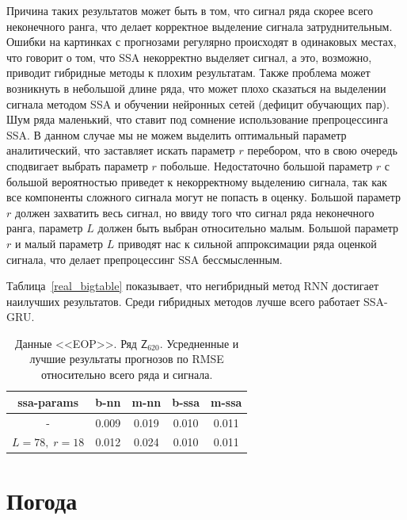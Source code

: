 \documentclass[specialist,
               substylefile = spbu.rtx,
               subf,href,colorlinks=true, 12p]{disser}
\begin{document}
Причина таких результатов может быть в том, что сигнал ряда скорее всего неконечного ранга, что делает корректное выделение сигнала затруднительным. Ошибки на картинках с прогнозами регулярно происходят в одинаковых местах, что говорит о том, что SSA некорректно выделяет сигнал, а это, возможно, приводит гибридные методы к плохим результатам. Также проблема может возникнуть в небольшой длине ряда, что может плохо сказаться на выделении сигнала методом SSA и обучении нейронных сетей (дефицит обучающих пар). Шум ряда маленький, что ставит под сомнение использование препроцессинга SSA. В данном случае мы не можем выделить оптимальный параметр аналитический, что заставляет искать параметр $r$ перебором, что в свою очередь сподвигает выбрать параметр $r$ побольше. Недостаточно большой параметр $r$ с большой вероятностью приведет к некорректному выделению сигнала, так как все компоненты сложного сигнала могут не попасть в оценку. Большой параметр $r$ должен захватить весь сигнал, но ввиду того что сигнал ряда неконечного ранга, параметр $L$ должен быть выбран относительно малым. Большой параметр $r$ и малый параметр $L$ приводят нас к сильной аппроксимации ряда оценкой сигнала, что делает препроцессинг SSA бессмысленным.

Таблица~\ref{real_bigtable} показывает, что негибридный метод RNN достигает наилучших результатов. Среди гибридных методов лучше всего работает SSA-GRU.

\begin{table}[h]
	\captionsetup{justification=centering}
	\caption{Данные <<EOP>>. Ряд $\mathsf{Z}_{620}$. Усредненные и лучшие результаты прогнозов по RMSE относительно всего ряда и сигнала.}
	\begin{center}
		\begin{tabular}{ccccc}
			\toprule
			{ssa-params} &  b-nn &  m-nn &  b-ssa &  m-ssa \\
			\midrule
			-          & 0.009 & 0.019 &  0.010 &  0.011 \\
			$L = 78, \; r = 18$     & 0.012 & 0.024 &  0.010 &  0.011 \\
			\bottomrule
		\end{tabular}
	\end{center}
	\label{teop}
\end{table}

\clearpage

\section{Погода}
\label{weather}
\end{document}
